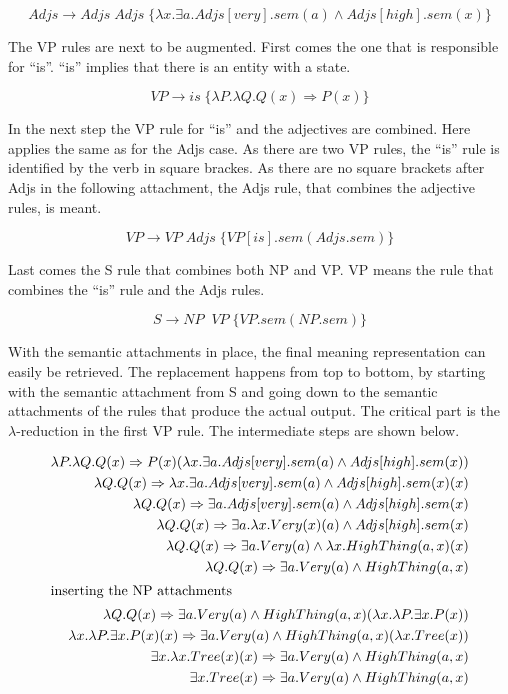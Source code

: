 \documentclass[12pt,twoside]{scrartcl}
\theoremstyle{plain}
\theoremstyle{definition}
\theoremstyle{remark}
\begin{document}
		\[
			Adjs \rightarrow Adjs\;Adjs \;\{\lambda x.\exists a.Adjs[very].sem(a) \wedge Adjs[high].sem(x) \}
		\]
		
		The VP rules are next to be augmented. First comes the one that is responsible for ``is''. ``is'' implies that there is an entity with a state.
		
		\[
			VP \rightarrow is \;\{\lambda P.\lambda Q.Q(x) \Rightarrow P(x)\}
		\]
		
		In the next step the VP rule for ``is'' and the adjectives are combined. Here applies the same as for the Adjs case. As there are two VP rules, the ``is'' rule is identified by the verb in square brackes. As there are no square brackets after Adjs in the following attachment, the Adjs rule, that combines the adjective rules, is meant.
		
		\[
			VP \rightarrow VP\;Adjs \;\{VP[is].sem(Adjs.sem)\}
		\]
		
		Last comes the S rule that combines both NP and VP. VP means the rule that combines the ``is'' rule and the Adjs rules.
		
		\[
			S \rightarrow NP\;\;VP \;\{VP.sem(NP.sem)\}
		\]
		
		With the semantic attachments in place, the final meaning representation can easily be retrieved. The replacement happens from top to bottom, by starting with the semantic attachment from S and going down to the semantic attachments of the rules that produce the actual output. The critical part is the $\lambda$-reduction in the first VP rule. The intermediate steps are shown below.
		
		\begin{alignat*}{1}
			\lambda P.\lambda Q.Q(x) \Rightarrow P(x)(\lambda x.\exists a.Adjs[very].sem(a) \wedge Adjs[high].sem(x)) \\
			\lambda Q.Q(x) \Rightarrow \lambda x.\exists a.Adjs[very].sem(a) \wedge Adjs[high].sem(x)(x) \\
			\lambda Q.Q(x) \Rightarrow \exists a.Adjs[very].sem(a) \wedge Adjs[high].sem(x) \\
			\lambda Q.Q(x) \Rightarrow \exists a.\lambda x.Very(x)(a) \wedge Adjs[high].sem(x) \\
			\lambda Q.Q(x) \Rightarrow \exists a.Very(a) \wedge \lambda x.HighThing(a, x)(x) \\
			\lambda Q.Q(x) \Rightarrow \exists a.Very(a) \wedge HighThing(a, x) \\
			\intertext{inserting the NP attachments}
			\lambda Q.Q(x) \Rightarrow \exists a.Very(a) \wedge HighThing(a, x)(\lambda x.\lambda P.\exists x.P(x)) \\
			\lambda x.\lambda P.\exists x.P(x)(x) \Rightarrow \exists a.Very(a) \wedge HighThing(a, x)(\lambda x.Tree(x)) \\
			\exists x.\lambda x.Tree(x)(x) \Rightarrow \exists a.Very(a) \wedge HighThing(a, x) \\
			\exists x.Tree(x) \Rightarrow \exists a.Very(a) \wedge HighThing(a, x)
		\end{alignat*}
		
\end{document}
